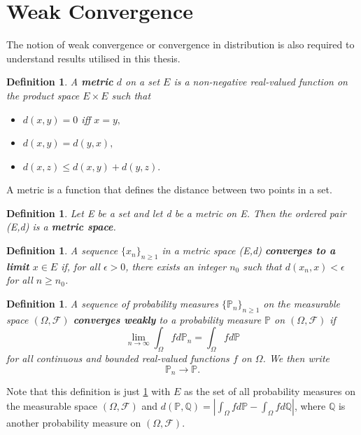 \documentclass[honours,12pt]{unswthesis}
\newcommand{\PP}{\mathbb{P}}
\newcommand{\1}{\mathbf 1}
\newcommand{\FF}{\mathcal{F}}
\newtheorem{definition}[equation]{Definition}
\numberwithin{equation}{section}
\theoremstyle{definition}
\theoremstyle{remark}
\begin{document}
\section{Weak Convergence}
The notion of weak convergence or convergence in distribution is also required to understand results utilised in this thesis.\\

\begin{definition}
A \textbf{metric} $d$ on a set $E$ is a non-negative real-valued function on the product space $E\times E$ such that
	\begin{itemize}
		\item $d(x,y)=0$ iff $x=y,$
		\item $d(x,y)=d(y,x),$
		\item $d(x,z) \leq d(x,y)+d(y,z).$
	\end{itemize}
\end{definition}
\noindent A metric is a function that defines the distance between two points in a set.\\

\begin{definition}
Let E be a set and let d be a metric on E. Then the ordered pair (E,d) is a \textbf{metric space}.\\
\end{definition}

\begin{definition}\label{def:metricConvergence}
A sequence $\{x_n\}_{n\geq1}$ in a metric space (E,d) \textbf{converges to a limit} $x\in E$ if, for all $\epsilon>0$, there exists an integer $n_0$ such that $d(x_n,x)<\epsilon$ for all $n\geq n_0$.\\
\end{definition}

\begin{definition}
A sequence of probability measures $\{\PP_n\}_{n \geq 1}$ on the measurable space $(\Omega, \FF)$ \textbf{converges weakly} to a probability measure $\PP$ on $(\Omega, \FF)$ if
\[
\lim_{n\rightarrow \infty} \int_\Omega fd\PP_n = \int_\Omega fd\PP
\]
for all continuous and bounded real-valued functions $f$ on $\Omega$. We then write \[\PP_n\rightarrow\PP.\]
\end{definition}
\noindent Note that this definition is just \ref{def:metricConvergence} with $E$ as the set of all probability measures on the measurable space $(\Omega, \FF)$ and $d(\PP,\mathbb{Q})=|\int_\Omega fd\PP- \int_\Omega fd\mathbb{Q}|$, where $\mathbb{Q}$ is another probability measure on $(\Omega, \FF).$\\
\end{document}
